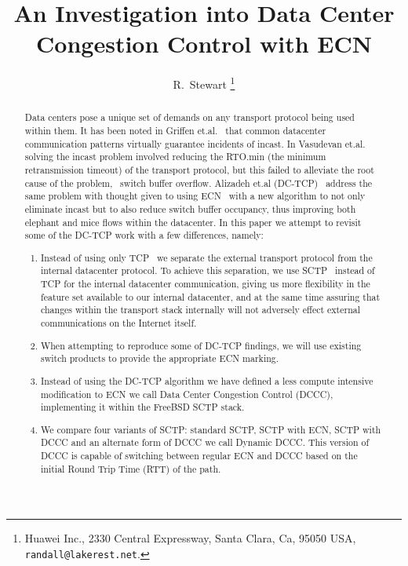 \documentclass[12pt]{article}
\begin{document}
%
%
\title{An Investigation into Data Center Congestion Control with ECN}
\author{R.~Stewart%
        \thanks{Huawei Inc.,
                2330 Central Expressway,
                Santa Clara, Ca, 95050
                USA,
                \texttt{randall@lakerest.net}.}
}

\maketitle


\begin{abstract}
Data centers pose a unique set of demands on any transport protocol being used
within them. It has been noted in Griffen et.al.~\cite{griffen} that common datacenter
communication patterns virtually guarantee incidents of incast. In Vasudevan et.al.~\cite{vasudevan} solving the incast
problem involved reducing the RTO.min (the minimum retransmission timeout) of the transport protocol, but
this failed to alleviate the root cause of the problem, ~switch buffer
overflow. Alizadeh et.al (DC-TCP)~\cite{alizadeh} address the same problem
 with thought given to using ECN~\cite{rfc3168}  with a new algorithm to not only eliminate
incast but to also reduce switch buffer occupancy, thus improving both elephant and mice flows
within the datacenter. In this paper we attempt to revisit some of the DC-TCP  work with a few differences, namely:

\begin{enumerate}
 \item  Instead of using only TCP~\cite{rfc793} we separate the external transport protocol from the internal datacenter protocol.
 To achieve this separation, we use SCTP~\cite{rfc4960} instead of TCP
 for the internal datacenter communication, giving us more flexibility in the feature set available to our internal datacenter, and at the same
 time assuring that changes within the transport stack internally will not adversely effect external communications on
 the Internet itself.
\item  When attempting to reproduce some of DC-TCP findings, we will use existing switch products
to provide the appropriate ECN marking.
\item Instead of using the DC-TCP algorithm we have defined a less compute intensive modification
to ECN we call Data Center Congestion Control (DCCC), implementing it within the FreeBSD SCTP stack.
\item We compare four variants of SCTP: standard SCTP, SCTP with ECN, SCTP with DCCC and an alternate
form of DCCC we call Dynamic DCCC. This version of DCCC is capable of switching between regular ECN
and DCCC based on the initial Round Trip Time (RTT) of the path. 
\end{enumerate}

\end{abstract}
\end{document}
